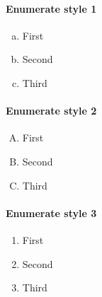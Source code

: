 \documentclass{article}
\begin{document}
\paragraph{Enumerate style 1}

\begin{enumerate}[a.]
    \item
    First
    \item
    Second
    \item
    Third
\end{enumerate}

\paragraph{Enumerate style 2}

\begin{enumerate}[A.]
    \item
    First
    \item
    Second
    \item
    Third
\end{enumerate}

\paragraph{Enumerate style 3}

\begin{enumerate}[1.]
    \item
    First
    \item
    Second
    \item
    Third
\end{enumerate}
\end{document}
